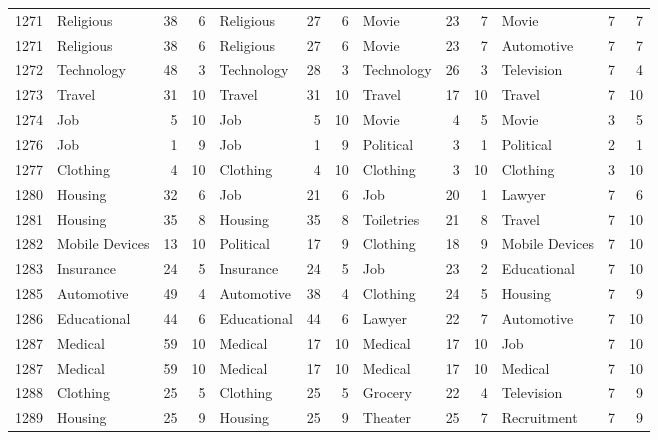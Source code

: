 \begin{figure}[htbp]
\begin{tabular}{rlrrlrrlrrlrr}
    1271  & Religious & 38    & 6     & Religious & 27    & 6     & Movie & 23    & 7     & Movie & 7     & 7 \\
    1271  & Religious & 38    & 6     & Religious & 27    & 6     & Movie & 23    & 7     & Automotive & 7     & 7 \\
    1272  & Technology & 48    & 3     & Technology & 28    & 3     & Technology & 26    & 3     & Television & 7     & 4 \\
    1273  & Travel & 31    & 10    & Travel & 31    & 10    & Travel & 17    & 10    & Travel & 7     & 10 \\
    1274  & Job   & 5     & 10    & Job   & 5     & 10    & Movie & 4     & 5     & Movie & 3     & 5 \\
    1276  & Job   & 1     & 9     & Job   & 1     & 9     & Political & 3     & 1     & Political & 2     & 1 \\
    1277  & Clothing & 4     & 10    & Clothing & 4     & 10    & Clothing & 3     & 10    & Clothing & 3     & 10 \\
    1280  & Housing & 32    & 6     & Job   & 21    & 6     & Job   & 20    & 1     & Lawyer & 7     & 6 \\
    1281  & Housing & 35    & 8     & Housing & 35    & 8     & Toiletries & 21    & 8     & Travel & 7     & 10 \\
    1282  & Mobile Devices & 13    & 10    & Political & 17    & 9     & Clothing & 18    & 9     & Mobile Devices & 7     & 10 \\
    1283  & Insurance & 24    & 5     & Insurance & 24    & 5     & Job   & 23    & 2     & Educational & 7     & 10 \\
    1285  & Automotive & 49    & 4     & Automotive & 38    & 4     & Clothing & 24    & 5     & Housing & 7     & 9 \\
    1286  & Educational & 44    & 6     & Educational & 44    & 6     & Lawyer & 22    & 7     & Automotive & 7     & 10 \\
    1287  & Medical & 59    & 10    & Medical & 17    & 10    & Medical & 17    & 10    & Job   & 7     & 10 \\
    1287  & Medical & 59    & 10    & Medical & 17    & 10    & Medical & 17    & 10    & Medical & 7     & 10 \\
    1288  & Clothing & 25    & 5     & Clothing & 25    & 5     & Grocery & 22    & 4     & Television & 7     & 9 \\
    1289  & Housing & 25    & 9     & Housing & 25    & 9     & Theater & 25    & 7     & Recruitment & 7     & 9 \\

\end{tabular}
\end{figure}
